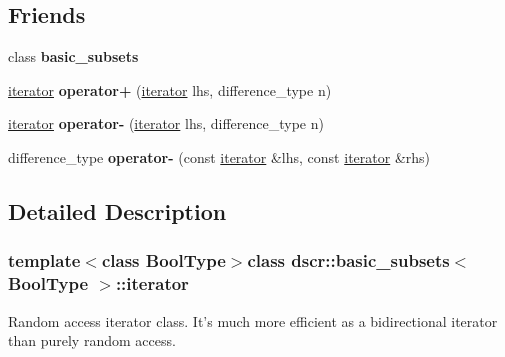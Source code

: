 \subsection*{Friends}
\begin{DoxyCompactItemize}
\item 
\hypertarget{classdscr_1_1basic__subsets_1_1iterator_a6cf8333f0bc6a559385b55c16b45e772}{class {\bfseries basic\-\_\-subsets}}\label{classdscr_1_1basic__subsets_1_1iterator_a6cf8333f0bc6a559385b55c16b45e772}

\item 
\hypertarget{classdscr_1_1basic__subsets_1_1iterator_aac5493422e75e70b321e439c45168fd0}{\hyperlink{classdscr_1_1basic__subsets_1_1iterator}{iterator} {\bfseries operator+} (\hyperlink{classdscr_1_1basic__subsets_1_1iterator}{iterator} lhs, difference\-\_\-type n)}\label{classdscr_1_1basic__subsets_1_1iterator_aac5493422e75e70b321e439c45168fd0}

\item 
\hypertarget{classdscr_1_1basic__subsets_1_1iterator_a87727d9351117b3726fbeac5da5eb28c}{\hyperlink{classdscr_1_1basic__subsets_1_1iterator}{iterator} {\bfseries operator-\/} (\hyperlink{classdscr_1_1basic__subsets_1_1iterator}{iterator} lhs, difference\-\_\-type n)}\label{classdscr_1_1basic__subsets_1_1iterator_a87727d9351117b3726fbeac5da5eb28c}

\item 
\hypertarget{classdscr_1_1basic__subsets_1_1iterator_a4304f5d7bb1d12de2d2ad2c1e4e64dab}{difference\-\_\-type {\bfseries operator-\/} (const \hyperlink{classdscr_1_1basic__subsets_1_1iterator}{iterator} \&lhs, const \hyperlink{classdscr_1_1basic__subsets_1_1iterator}{iterator} \&rhs)}\label{classdscr_1_1basic__subsets_1_1iterator_a4304f5d7bb1d12de2d2ad2c1e4e64dab}

\end{DoxyCompactItemize}


\subsection{Detailed Description}
\subsubsection*{template$<$class Bool\-Type$>$class dscr\-::basic\-\_\-subsets$<$ Bool\-Type $>$\-::iterator}

Random access iterator class. It's much more efficient as a bidirectional iterator than purely random access. 


